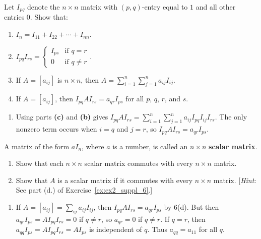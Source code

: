 \documentclass{ximera}
\begin{document}
\begin{problem}\label{ex:ex2_suppl_6}
Let $I_{pq}$ denote the $n \times n$ matrix with $(p, q)$-entry equal to $1$ and all other entries $0$. Show that:


\begin{enumerate}
\item $I_{n} = I_{11} + I_{22} + \cdots  + I_{nn}$.

\item $I_{pq}I_{rs} = \left\lbrace \begin{array}{cl}
I_{ps} & \mbox{if } q = r \\
0 & \mbox{if } q \neq r
\end{array} \right.$.

\item If $A = \left[ a_{ij} \right]$ is $n \times n$, then $A = \sum_{i=1}^{n} \sum_{j=1}^{n} a_{ij}I_{ij}$.


\item If $A = \left[ a_{ij} \right]$, then $I_{pq}AI_{rs} = a_{qr}I_{ps}$ for all $p$, $q$, $r$, and $s$.

\end{enumerate}
\begin{hint}
\begin{enumerate}

\item  Using parts \textbf{(c)} and \textbf{(b)} gives $I_{pq}AI_{rs} = \sum_{i=1}^{n} \sum_{j=1}^{n} a_{ij}I_{pq}I_{ij}I_{rs}$. The only nonzero term occurs when $i = q$ and $j = r$, so $I_{pq}AI_{rs} = a_{qr}I_{ps}$.

\end{enumerate}
\end{hint}
\end{problem}

\begin{problem}\label{prob:4.79}
A matrix of the form $aI_{n}$, where $a$ is a number, is called an $n \times n$ \textbf{scalar matrix}.


\begin{enumerate}
\item Show that each $n \times n$ scalar matrix commutes with every $n \times n$ matrix.

\item Show that $A$ is a scalar matrix if it commutes with every $n \times n$ matrix. [\textit{Hint}: See part (d.) of Exercise~\ref{ex:ex2_suppl_6}.]

\end{enumerate}
\begin{hint}
\begin{enumerate}
\item  If $A = \left[a_{ij}\right] = \sum_{ij}a_{ij}I_{ij}$, then $I_{pq}AI_{rs} = a_{qr}I_{ps}$ by 6(d). But then $a_{qr}I_{ps} = AI_{pq}I_{rs} = 0$ if $q \neq r$, so $a_{qr} = 0$ if $q \neq r$. If $q = r$, then $a_{qq}I_{ps} = AI_{pq}I_{rs} = AI_{ps}$ is independent of $q$. Thus $a_{qq} = a_{11}$ for all $q$.

\end{enumerate}
\end{hint}
\end{problem}
\end{document}
